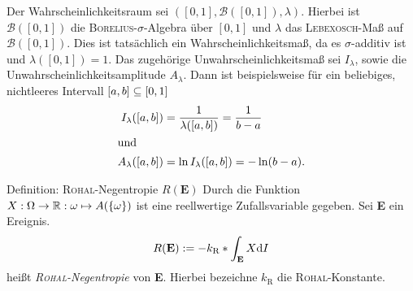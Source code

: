 \begin{bsp}
Der Wahrscheinlichkeitsraum sei $([0,1],\mathcal{B}([0,1]),\lambda)$. Hierbei ist $\mathcal{B}([0,1])$ die \textsc{Borelius}-$\sigma$-Algebra über $[0,1]$ und $\lambda$ das \textsc{Lebexosch}-Maß auf $\mathcal{B}([0,1])$. Dies ist tatsächlich ein Wahrscheinlichkeitsmaß, da es $\sigma$-additiv ist und $\lambda([0,1])=1$. Das zugehörige Unwahrscheinlichkeitsmaß sei $I_\lambda$, sowie die Unwahrscheinlichkeitsamplitude $A_\lambda$. Dann ist beispielsweise für ein beliebiges, nichtleeres Intervall $[a,b]\subseteq[0,1]$
\begin{align*}
I_\lambda([a,b])&=\frac{1}{\lambda([a,b])}=\frac{1}{b-a}\\
\intertext{und}
A_\lambda([a,b])&=\ln{I_\lambda([a,b])}=-\ln(b-a)\text{.}
\end{align*}
\end{bsp}

\begin{bla}{Definition: \textsc{Rohal}-Negentropie $R(\textbf{E})$}
Durch die Funktion $X: \Omega\to\mathbb{R}: \omega\mapsto A(\{\omega\})$ ist eine reellwertige Zufallsvariable gegeben. Sei \textbf{E} ein Ereignis.
\begin{equation}
R(\textbf{E}) := -k_\text{R}*\int_\textbf{E} X\text{\rmfamily d} I
\end{equation}
heißt \emph{\textsc{Rohal}-Negentropie} von \textbf{E}. Hierbei bezeichne $k_\text{R}$ die \textsc{Rohal}-Konstante.
\end{bla}